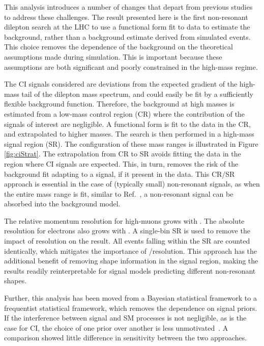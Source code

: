 This analysis introduces a number of changes that depart from previous studies to address these challenges.
The result presented here is the first non-resonant dilepton search at the LHC to use a functional form fit to data to estimate the background, rather than a background estimate derived from simulated events.
This choice removes the dependence of the background on the theoretical assumptions made during simulation.
This is important because these assumptions are both significant and poorly constrained in the high-mass regime.

The CI signals considered are deviations from the expected gradient of the high-mass tail of the dilepton mass spectrum, and could easily be fit by a sufficiently flexible background function.
Therefore, the background at high masses is estimated from a low-mass control region (CR) where the contribution of the signals of interest are negligible.
A functional form is fit to the data in the CR, and extrapolated to higher masses.
The search is then performed in a high-mass signal region (SR).
The configuration of these mass ranges is illustrated in Figure \ref{fig:ciStrat}.
The extrapolation from CR to SR avoids fitting the data in the region where CI signals are expected.
This, in turn, removes the risk of the background fit adapting to a signal, if it present in the data.
This CR/SR approach is essential in the case of (typically small) non-resonant signals, as when the entire mass range is fit, similar to Ref.~\cite{Aad:2019fac}, a non-resonant signal can be absorbed into the background model.

The relative momentum resolution for high-\pt muons grows with \pt.
The absolute \et resolution for electrons also grows with \et.
A single-bin SR is used to remove the impact of resolution on the result.
All events falling within the SR are counted identically, which mitigates the importance of \et/\pt resolution.
This approach has the additional benefit of removing shape information in the signal region, making the results readily reinterpretable for signal models predicting different non-resonant shapes.

Further, this analysis has been moved from a Bayesian statistical framework to a frequentist statistical framework, which removes the dependence on signal priors.
If the interference between signal and SM processes is not negligible, as is the case for CI, the choice of one prior over another is less unmotivated~\cite{Aad:2012hf,EXOT-2016-05}.
A comparison showed little difference in sensitivity between the two approaches.

